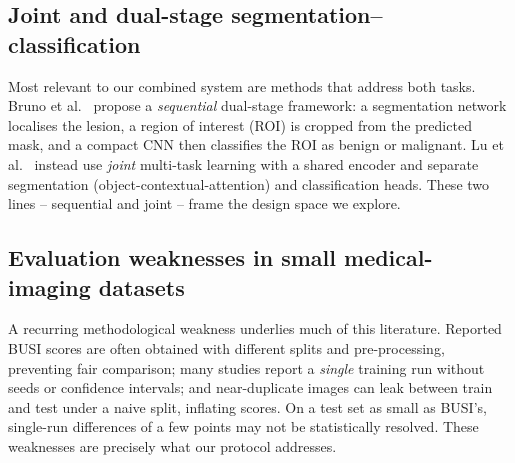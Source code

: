 \documentclass[11pt]{article}
\begin{document}
\subsection{Joint and dual-stage segmentation--classification}
Most relevant to our combined system are methods that address both tasks. Bruno
et al.~\cite{bruno2025dualstage} propose a \emph{sequential} dual-stage
framework: a segmentation network localises the lesion, a region of interest
(ROI) is cropped from the predicted mask, and a compact CNN then classifies the
ROI as benign or malignant. Lu et al.~\cite{lu2025multitask} instead use
\emph{joint} multi-task learning with a shared encoder and separate segmentation
(object-contextual-attention) and classification heads. These two lines --
sequential and joint -- frame the design space we explore.

\subsection{Evaluation weaknesses in small medical-imaging datasets}
A recurring methodological weakness underlies much of this literature. Reported
BUSI scores are often obtained with different splits and pre-processing,
preventing fair comparison; many studies report a \emph{single} training run
without seeds or confidence intervals; and near-duplicate images can leak between
train and test under a naive split, inflating scores. On a test set as small as
BUSI's, single-run differences of a few points may not be statistically
resolved. These weaknesses are precisely what our protocol addresses.
\end{document}
